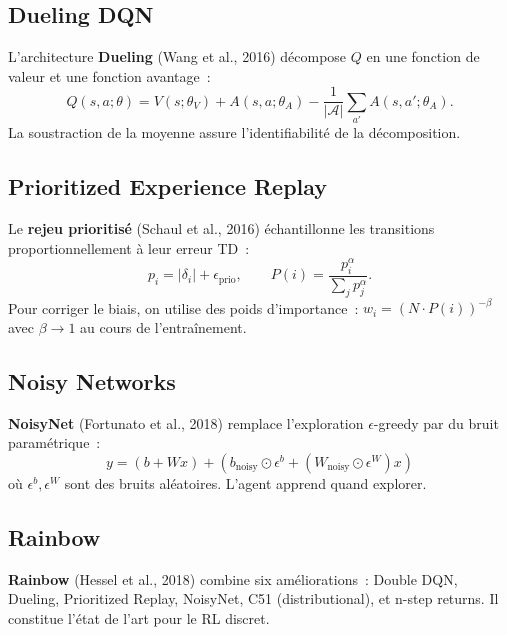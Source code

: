 \subsection{Dueling DQN}

\begin{definition}
L'architecture \textbf{Dueling} (Wang et al., 2016) d\'ecompose $Q$ en une
fonction de valeur et une fonction avantage~:
\[
    Q(s, a; \theta) = V(s; \theta_V) + A(s, a; \theta_A)
    - \frac{1}{|\mathcal{A}|} \sum_{a'} A(s, a'; \theta_A).
\]
La soustraction de la moyenne assure l'identifiabilit\'e de la d\'ecomposition.
\end{definition}

\subsection{Prioritized Experience Replay}

\begin{definition}
Le \textbf{rejeu prioritis\'e} (Schaul et al., 2016) \'echantillonne les transitions
proportionnellement \`a leur erreur TD~:
\[
    p_i = |\delta_i| + \epsilon_{\text{prio}}, \qquad
    P(i) = \frac{p_i^\alpha}{\sum_j p_j^\alpha}.
\]
Pour corriger le biais, on utilise des poids d'importance~:
$w_i = (N \cdot P(i))^{-\beta}$ avec $\beta \to 1$ au cours de l'entra\^inement.
\end{definition}

\subsection{Noisy Networks}

\begin{definition}[NoisyNet]
\textbf{NoisyNet} (Fortunato et al., 2018) remplace l'exploration $\epsilon$-greedy
par du bruit param\'etrique~:
\[
    y = (b + W x) + (b_{\text{noisy}} \odot \epsilon^b + (W_{\text{noisy}} \odot \epsilon^W) x)
\]
o\`u $\epsilon^b, \epsilon^W$ sont des bruits al\'eatoires. L'agent apprend
quand explorer.
\end{definition}

\subsection{Rainbow}

\begin{remarque}
\textbf{Rainbow} (Hessel et al., 2018) combine six am\'eliorations~:
Double DQN, Dueling, Prioritized Replay, NoisyNet, C51 (distributional), et
n-step returns. Il constitue l'\'etat de l'art pour le RL discret.
\end{remarque}

